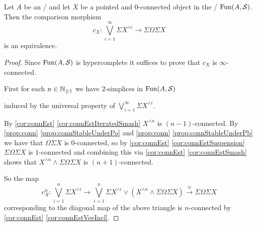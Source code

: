 \begin{prop}\label{prop:jamesSplittingPresheaf} %
    Let $A$ be an \inftycat/ and let $X$ be a pointed and $0$-connected object in the \inftytop/ $\operatorname{Fun}(A,\mathcal{S})$. %
    Then the comparison morphism 
    \begin{equation*}
        c_X\colon\bigvee\limits_{i=1}^{\infty}\Sigma X^{\wedge i}\to\Sigma\Omega\Sigma X
    \end{equation*}
    is an equivalence. 
    \begin{proof}
        Since $\operatorname{Fun}(A,\mathcal{S})$ is hypercomplete %
        it suffices to prove that $c_X$ is $\infty$-connected.

        First for each $n\in\mathbb{N}_{\geq 1}$ we have $2$-simplices in $\operatorname{Fun}(A,\mathcal{S})$
        \begin{center}
        \end{center}
        induced by the universal property of $\bigvee\limits_{i=1}^{\infty}\Sigma X^{\wedge i}$.

        By \cref{cor:connEst} \ref{cor:connEstIteratedSmash} $X^{\wedge n}$ is $(n-1)$-connected.
        By \cref{prop:conn} \ref{prop:connStableUnderPo} and \cref{prop:conn} \ref{prop:connStableUnderPb} we have that $\Omega\Sigma X$ is $0$-connected, so by \cref{cor:connEst} \ref{cor:connEstSuspension} $\Sigma\Omega\Sigma X$ is $1$-connected and combining this via \cref{cor:connEst} \ref{cor:connEstSmash} shows that $X^{\wedge n}\wedge\Sigma\Omega\Sigma X$ is $(n+1)$-connected.

        So the map 
        \begin{equation*}
            c_X^n\colon\bigvee\limits_{i=1}^n\Sigma X^{\wedge i}\to\bigvee\limits_{i=1}^n\Sigma X^{\wedge i}\vee\left(X^{\wedge n}\wedge\Sigma\Omega\Sigma X\right)\xrightarrow{\cong}\Sigma\Omega\Sigma X
        \end{equation*}
        corresponding to the diagonal map of the above triangle is $n$-connected by \cref{cor:connEst} \ref{cor:connEstVeeIncl}.


\end{proof}
\end{prop}
